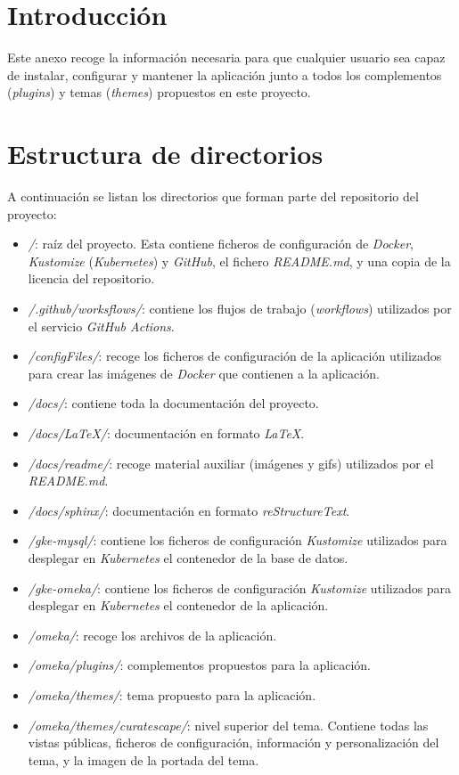 
\section{Introducción}

Este anexo recoge la información necesaria para que cualquier usuario
sea capaz de instalar, configurar y mantener la aplicación junto a todos
los complementos (\emph{plugins}) y temas (\emph{themes}) propuestos en
este proyecto.

\section{Estructura de directorios}

A continuación se listan los directorios que forman parte del
repositorio del proyecto:

\begin{itemize}
\tightlist
\item
  \emph{/}: raíz del proyecto. Esta contiene ficheros de configuración
  de \emph{Docker}, \emph{Kustomize} (\emph{Kubernetes}) y
  \emph{GitHub}, el fichero \emph{README.md}, y una copia de la licencia
  del repositorio.
\item
  \emph{/.github/worksflows/}: contiene los flujos de trabajo
  (\emph{workflows}) utilizados por el servicio \emph{GitHub Actions}.
\item
  \emph{/configFiles/}: recoge los ficheros de configuración de la
  aplicación utilizados para crear las imágenes de \emph{Docker} que
  contienen a la aplicación.
\item
  \emph{/docs/}: contiene toda la documentación del proyecto.
\item
  \emph{/docs/LaTeX/}: documentación en formato \emph{LaTeX}.
\item
  \emph{/docs/readme/}: recoge material auxiliar (imágenes y gifs)
  utilizados por el \emph{README.md}.
\item
  \emph{/docs/sphinx/}: documentación en formato \emph{reStructureText}.
\item
  \emph{/gke-mysql/}: contiene los ficheros de configuración
  \emph{Kustomize} utilizados para desplegar en \emph{Kubernetes} el
  contenedor de la base de datos.
\item
  \emph{/gke-omeka/}: contiene los ficheros de configuración
  \emph{Kustomize} utilizados para desplegar en \emph{Kubernetes} el
  contenedor de la aplicación.
\item
  \emph{/omeka/}: recoge los archivos de la aplicación.
\item
  \emph{/omeka/plugins/}: complementos propuestos para la aplicación.
\item
  \emph{/omeka/themes/}: tema propuesto para la aplicación.
\item
  \emph{/omeka/themes/curatescape/}: nivel superior del tema. Contiene
  todas las vistas públicas, ficheros de configuración, información y
  personalización del tema, y la imagen de la portada del tema.
\end{itemize}

